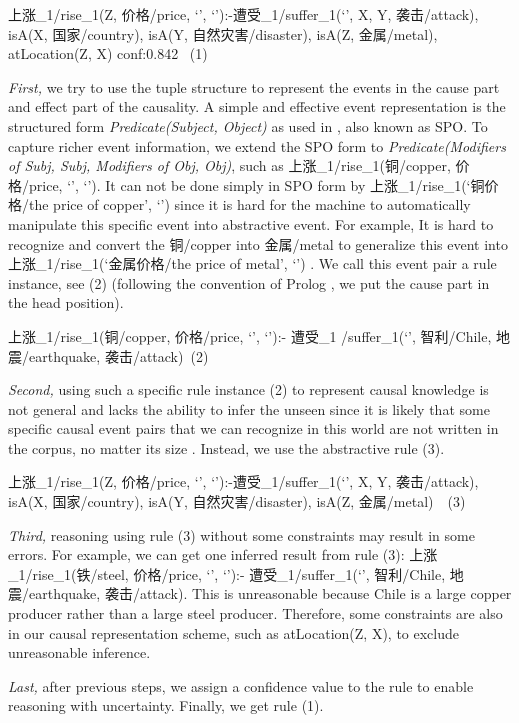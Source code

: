 上涨\_1/rise\_1(Z, 价格/price, `', `'):-遭受\_1/suffer\_1(`', X, Y, 袭击/attack), isA(X, 国家/country), isA(Y, 自然灾害/disaster), isA(Z, 金属/metal), atLocation(Z, X) conf:0.842 \ (1)

\textit{First,} we try to use the tuple structure to represent the events in the cause part and effect part of the causality. A simple and effective event representation is the structured form \textit{Predicate(Subject, Object)} as used in \cite{ding2015deep}, also known as SPO. To capture richer event information, we extend the SPO form to \textit{Predicate(Modifiers of Subj, Subj, Modifiers of Obj, Obj)}, such as 上涨\_1/rise\_1(铜/copper, 价格/price, `', `'). It can not be done simply in SPO form by 上涨\_1/rise\_1(`铜价格/the price of copper', `') since it is hard for the machine to automatically manipulate this specific event into abstractive event. For example, It is hard to recognize and convert the 铜/copper into 金属/metal to generalize this event into 上涨\_1/rise\_1(`金属价格/the price of metal', `') .
We call this event pair a rule instance, see (2) (following the convention of Prolog \cite{Wielemaker2010}, we put the cause part in the head position).

上涨\_1/rise\_1(铜/copper, 价格/price, `', `'):- 遭受\_1 /suffer\_1(`', 智利/Chile, 地震/earthquake, 袭击/attack)\ (2)

\textit{Second,} using such a specific rule instance (2) to represent causal knowledge is not general and lacks the ability to infer the unseen since it is likely that some specific causal event pairs that we can recognize in this world are not written in the
corpus, no matter its size \cite{ha2015gener}. Instead, we use the abstractive rule (3).

上涨\_1/rise\_1(Z, 价格/price, `', `'):-遭受\_1/suffer\_1(`', X, Y, 袭击/attack), isA(X, 国家/country), isA(Y, 自然灾害/disaster), isA(Z, 金属/metal)\ \ (3)

\textit{Third,} reasoning using rule (3) without some constraints may result in some errors. For example, we can get one inferred result from rule (3): 上涨\_1/rise\_1(铁/steel, 价格/price, `', `'):- 遭受\_1/suffer\_1(`', 智利/Chile, 地震/earthquake, 袭击/attack). This is unreasonable because Chile is a large copper producer rather than a large steel producer. Therefore, some constraints are also in our causal representation scheme, such as atLocation(Z, X), to exclude unreasonable inference.

\textit{Last,} after previous steps, we assign a confidence value to the rule to enable reasoning with uncertainty. Finally, we get rule (1).

